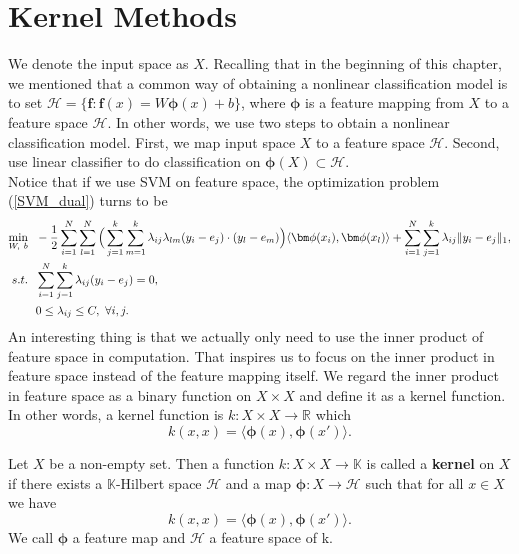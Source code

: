 \section{Kernel Methods}
We denote the input space as $X$. Recalling that in the beginning of this chapter, we mentioned that a common way of obtaining a nonlinear classification model is to set $\mathscr{H} = \{\bm{f}: \bm{f}(x) = W\bm{\phi}(x)+b\}$, where $\bm{\phi}$ is a feature mapping from $X$ to a feature space $\mathcal{H}$. In other words, we use two steps to obtain a nonlinear classification model. First, we map input space $X$ to a feature space $\mathcal{H}$. Second, use linear classifier to do classification on $\bm\phi(X)\subset \mathcal{H}$.\\
Notice that if we use SVM on feature space, the optimization problem (\ref{SVM_dual}) turns to be
\begin{equation}{\label{SVM_dual}}
\begin{aligned}
\min_{W,~b}&~~ -\frac{1}{2}\displaystyle\sum_{i=1}^N\sum_{l=1}^N\Big(\displaystyle\sum_{j=1}^k\sum_{m=1}^k \lambda_{ij}\lambda_{lm}(y_i-e_j)\cdot(y_l-e_m)\Big)\langle\bm\phi(x_i),\bm\phi(x_l)\rangle+ \displaystyle\sum_{i=1}^N\sum_{j=1}^k\lambda_{ij}\|y_i - e_j\|_1,\\
s.t.&~~\displaystyle \sum_{i=1}^N\sum_{j=1}^k\lambda_{ij}(y_i - e_j) = 0,\\
&~~0\leq \lambda_{ij}\leq C,~\forall i,j.
\end{aligned}
\end{equation}
An interesting thing is that we actually only need to use the inner product of feature space in computation. That inspires us to focus on the inner product in feature space instead of the feature mapping itself.  We regard the inner product in feature space as a binary function on $X\times X$ and define it as a kernel function. In other words, a kernel function is $k: X\times X \rightarrow \mathbb{R}$ which
\begin{equation}
k(x,x) = \langle\bm\phi(x),\bm\phi(x')\rangle.
\end{equation}

\begin{definition}
Let $X$ be a non-empty set. Then a function $k:X\times X \rightarrow\mathbb{K}$ is
called a \textbf{kernel} on $X$ if there exists a $\mathbb{K}$-Hilbert space $\mathcal{H}$ and a map $\bm{\phi}:X\rightarrow \mathcal{H}$ such that for all $x \in X$ we have
\begin{equation}
k(x,x) = \langle\bm\phi(x),\bm\phi(x')\rangle.
\end{equation}
We call $\bm{\phi}$ a feature map and $\mathcal{H}$ a feature space of k.
\end{definition}


